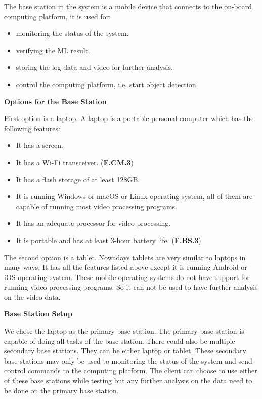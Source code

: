 The base station in the system is a mobile device that connects to the on-board computing platform, it is used for:
\begin{itemize}
    \item monitoring the status of the system.
    \item verifying the ML result.
    \item storing the log data and video for further analysis.
    \item control the computing platform, i.e. start object detection.
\end{itemize}

\textbf{Options for the Base Station}

First option is a laptop. A laptop is a portable personal computer which has the following features:
\begin{itemize}
    \item It has a screen.
    \item It has a Wi-Fi transceiver. (\textbf{F.CM.3})
    \item It has a flash storage of at least 128GB.
    \item It is running Windows or macOS or Linux operating system, all of them are capable of running most video processing programs.
    \item It has an adequate processor for video processing.
    \item It is portable and has at least 3-hour battery life. (\textbf{F.BS.3})
\end{itemize}

The second option is a tablet. Nowadays tablets are very similar to laptops in many ways. It has all the features listed above except it is running Android or iOS operating system. These mobile operating systems do not have support for running video processing programs. So it can not be used to have further analysis on the video data.

\textbf{Base Station Setup}

We chose the laptop as the primary base station. The primary base station is capable of doing all tasks of the base station. There could also be multiple secondary base stations. They can be either laptop or tablet. These secondary base stations may only be used to monitoring the status of the system and send control commands to the computing platform. The client can choose to use either of these base stations while testing but any further analysis on the data need to be done on the primary base station.

